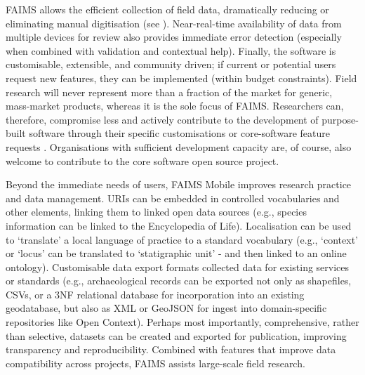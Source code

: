 \documentclass[preprint,12pt, a4paper]{elsarticle}
\begin{document}
FAIMS allows the efficient collection of field data, dramatically reducing or eliminating manual digitisation (see \cite{Sobotkova2016-mx}). Near-real-time availability of data from multiple devices for review also provides immediate error detection (especially when combined with validation and contextual help). Finally, the software is customisable, extensible, and community driven; if current or potential users request new features, they can be implemented (within budget constraints). Field research will never represent more than a fraction of the market for generic, mass-market products, whereas it is the sole focus of FAIMS. Researchers can, therefore, compromise less and actively contribute to the development of purpose-built software through their specific customisations or core-software feature requests \cite{Sobotkova2016-mx}. Organisations with sufficient development capacity are, of course, also welcome to contribute to the core software open source project.

Beyond the immediate needs of users, FAIMS Mobile improves research practice and data management. URIs can be embedded in controlled vocabularies and other elements\cite{Sobotkova2015-lq}, linking them to linked open data sources (e.g., species information can be linked to the Encyclopedia of Life\cite{Wilson2003-xx}). Localisation can be used to `translate' a local language of practice to a standard vocabulary (e.g., `context' or `locus' can be translated to `statigraphic unit' - and then linked to an online ontology). Customisable data export formats collected data for existing services or standards (e.g., archaeological records can be exported not only as shapefiles, CSVs, or a 3NF relational database for incorporation into an existing geodatabase, but also as XML or GeoJSON for ingest into domain-specific repositories like Open Context). Perhaps most importantly, comprehensive, rather than selective, datasets can be created and exported for publication, improving transparency and reproducibility. Combined with features that improve data compatibility across projects, FAIMS assists large-scale field research. 
\end{document}
